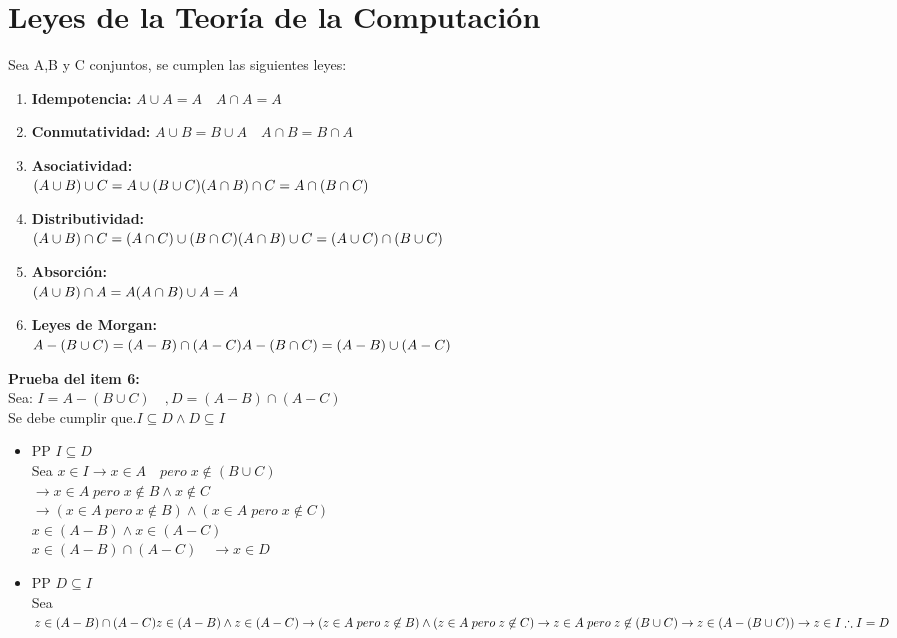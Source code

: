 \section{Leyes de la Teoría de la Computación}
Sea A,B y C conjuntos, se cumplen las siguientes leyes:
\begin{enumerate}
\item \textbf{Idempotencia: }$A\cup A=A \quad A\cap A=A$
\item \textbf{Conmutatividad: }$A\cup B=B\cup A \quad A\cap B=B\cap A$
\item \textbf{Asociatividad: }\\
	$(A\cup B)\cup C=A\cup(B\cup C) \\ (A\cap B)\cap C=A\cap(B\cap C)$
\item \textbf{Distributividad: }\\
	$(A\cup B)\cap C=(A\cap C)\cup(B\cap C) \\ (A\cap B)\cup C=(A\cup C)\cap(B\cup C)$
\item \textbf{Absorción: }\\
	$(A\cup B)\cap A=A \\ (A\cap B)\cup A=A$
\item \textbf{Leyes de Morgan: }\\
	$A-(B\cup C)=(A-B)\cap(A-C) \\ A-(B\cap C)=(A-B)\cup(A-C)$
\end{enumerate}
\textbf{Prueba del item 6: }\\
Sea: $I=A-(B\cup C) \quad , D=(A-B)\cap(A-C)$\\
Se debe cumplir que.$I\subseteq D \land D\subseteq I$
\begin{itemize}
\item PP $I\subseteq D$\\
	Sea $x \in I \rightarrow x\in A \quad pero\; x\not\in(B\cup C)$\\
	$\rightarrow x\in A\; pero\; x\not\in B\land x\not\in C$\\
	$\rightarrow (x\in A\; pero\; x\not\in B)\land(x\in A\; pero\; x\not\in C)$\\
	$x\in(A-B)\land x\in(A-C)$\\
	$x\in(A-B)\cap(A-C)\quad \rightarrow x\in D$
\item PP $D\subseteq I$\\
	Sea $z\in (A-B)\cap(A-C)\\
	z\in(A-B)\land z\in(A-C)\\
	\rightarrow (z\in A\; pero\; z\not\in B)\land(z\in A\; pero\; z\not\in C)\\
	\rightarrow z\in A\; pero\; z\not\in(B\cup C)\\
	\rightarrow z\in(A-(B\cup C))\\
	\rightarrow z\in I\\
	\therefore I=D$
\end{itemize}


